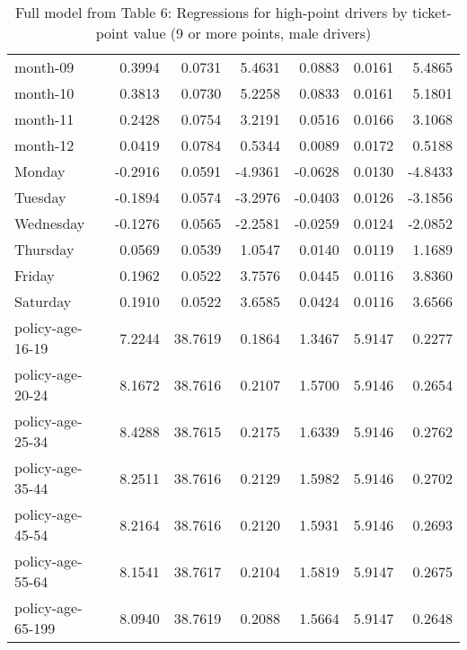 \documentclass[10pt]{article}
\begin{document}
\begin{table}[ht]
\begin{tabular}{lrrrrrr}
  month-09 & 0.3994 & 0.0731 & 5.4631 & 0.0883 & 0.0161 & 5.4865 \\ 
  month-10 & 0.3813 & 0.0730 & 5.2258 & 0.0833 & 0.0161 & 5.1801 \\ 
  month-11 & 0.2428 & 0.0754 & 3.2191 & 0.0516 & 0.0166 & 3.1068 \\ 
  month-12 & 0.0419 & 0.0784 & 0.5344 & 0.0089 & 0.0172 & 0.5188 \\ 
  Monday & -0.2916 & 0.0591 & -4.9361 & -0.0628 & 0.0130 & -4.8433 \\ 
  Tuesday & -0.1894 & 0.0574 & -3.2976 & -0.0403 & 0.0126 & -3.1856 \\ 
  Wednesday & -0.1276 & 0.0565 & -2.2581 & -0.0259 & 0.0124 & -2.0852 \\ 
  Thursday & 0.0569 & 0.0539 & 1.0547 & 0.0140 & 0.0119 & 1.1689 \\ 
  Friday & 0.1962 & 0.0522 & 3.7576 & 0.0445 & 0.0116 & 3.8360 \\ 
  Saturday & 0.1910 & 0.0522 & 3.6585 & 0.0424 & 0.0116 & 3.6566 \\ 
  policy-age-16-19 & 7.2244 & 38.7619 & 0.1864 & 1.3467 & 5.9147 & 0.2277 \\ 
  policy-age-20-24 & 8.1672 & 38.7616 & 0.2107 & 1.5700 & 5.9146 & 0.2654 \\ 
  policy-age-25-34 & 8.4288 & 38.7615 & 0.2175 & 1.6339 & 5.9146 & 0.2762 \\ 
  policy-age-35-44 & 8.2511 & 38.7616 & 0.2129 & 1.5982 & 5.9146 & 0.2702 \\ 
  policy-age-45-54 & 8.2164 & 38.7616 & 0.2120 & 1.5931 & 5.9146 & 0.2693 \\ 
  policy-age-55-64 & 8.1541 & 38.7617 & 0.2104 & 1.5819 & 5.9147 & 0.2675 \\ 
  policy-age-65-199 & 8.0940 & 38.7619 & 0.2088 & 1.5664 & 5.9147 & 0.2648 \\ 
   \hline
\end{tabular}
\caption{Full model from Table 6: Regressions for high-point drivers by ticket-point value (9 or more points, male drivers)} 
\label{tab_6_9plus_pts_M}
\end{table}


\clearpage
\pagebreak



\end{document}
